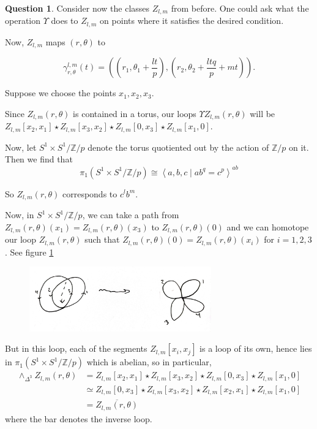 \documentclass[reqno]{amsart}
\theoremstyle{definition}
\newtheorem{question}[theorem]{Question}
\theoremstyle{remark}
\begin{document}
\begin{question}
Consider now the classes
$Z_{l,m}$ from before.
One could ask what the operation $\Upsilon$ does to
$Z_{l,m}$ on points where it satisfies the desired condition.
\end{question}



Now, $Z_{l,m}$ maps $\left( r, \theta \right) $ to

\[
    \gamma_{r,\theta}^{l,m}(t) =
    \left( \left( r_1, \theta_1 + \frac{lt}{p} \right) ,
    \left( r_2, \theta_2 + \frac{ltq}{p}+mt \right) \right) .
\] 

Suppose we choose the points
$x_1, x_2,x_3$.

Since $Z_{l,m}(r , \theta)$ is contained in
a torus, our loops
$\Upsilon Z_{l,m}(r, \theta)$ will
be
$Z_{l,m}[x_2,x_1] \star Z_{l,m}[x_3, x_2] \star
Z_{l,m}[0, x_3] \star Z_{l,m}[x_1, 0]$.

Now, let $S^{1} \times S^{1} / \mathbb{Z}/p$ denote the torus quotiented
out by the action of $\mathbb{Z}/p$ on it.
Then we find that
\[
\pi_1 \left( S^{1} \times S^{1} / \mathbb{Z}/p \right) \cong
\left<a,b,c  \mid ab^{q} = c^{p} \right>^{ab}
\] 

So $Z_{l,m}(r, \theta)$ corresponds to
$c^{l} b^{m}$.

Now, in
$S^{1} \times S^{1} / \mathbb{Z}/p$, we can
take a path from $Z_{l,m}\left( r,\theta \right) (x_1) = 
Z_{l,m}\left( r, \theta \right) (x_3)$ to
$Z_{l,m}(r, \theta) (0)$ and we can homotope our
loop $Z_{l,m}\left( r ,\theta \right) $ such that
$Z_{l,m}\left( r, \theta \right) (0) = 
Z_{l,m}(r, \theta)(x_i)$ for $i = 1,2,3$.
See figure \ref{fig:Figures-NGIWKZN-jpeg}


\begin{figure}[htpb]
    \centering
    \includegraphics[width=0.7\textwidth]{Figures/NGIWKZN.jpeg}
    \caption{}
    \label{fig:Figures-NGIWKZN-jpeg}
\end{figure}


But in this loop, each of the segments
$Z_{l,m}[x_i, x_j]$ is a loop of its own, hence
lies in
$\pi_1\left( S^{1} \times S^{1} / \mathbb{Z}/p \right) $ which is
abelian, so in particular,
\begin{align*}
    \wedge_{\Delta^3} Z_{l,m}(r, \theta)
    &=
    Z_{l,m}[x_2,x_1] \star Z_{l,m}[x_3,x_2] 
    \star Z_{l,m}[0,x_3] \star
    Z_{l,m}[x_1,0]\\
    &\simeq 
    Z_{l,m}[0,x_3] \star Z_{l,m} [x_3, x_2] \star
    Z_{l,m}[x_2,x_1] \star Z_{l,m}[x_1,0]\\
    &=
    \overline{ Z_{l,m} (r , \theta)}
\end{align*}
where the bar denotes the inverse loop.
\end{document}
